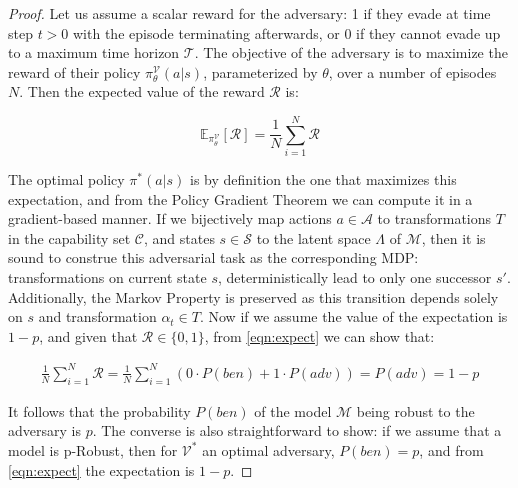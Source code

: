 \begin{proof}
Let us assume a scalar reward for the adversary: 1 if they evade at time step $t > 0$ with the episode terminating afterwards, or 0 if they cannot evade up to a maximum time horizon $\mathcal{T}$.
The objective of the adversary is to maximize the reward of their policy $\pi_\theta^\mathcal{V}(a|s)$, parameterized by $\theta$, over a number of episodes $N$.
Then the expected value of the reward $\mathcal{R}$ is:

\begin{equation}
    \mathbb{E}_{\pi_\theta^\mathcal{V}}[\mathcal{R}] = \frac{1}{N}\sum_{i=1}^{N}\mathcal{R}
\label{eqn:expect}
\end{equation}

The optimal policy $\pi^*(a|s)$ is by definition the one that maximizes this expectation, and from the Policy Gradient Theorem \cite{sutton1999policy} we can compute it in a gradient-based manner.
If we bijectively map actions $a \in \mathcal{A}$ to transformations $T$ in the capability set $\mathcal{C}$, and states $s \in \mathcal{S}$ to the latent space $\Lambda$ of $\mathcal{M}$, then it is sound to construe this adversarial task as the corresponding MDP: transformations on current state $s$, deterministically lead to only one successor $s'$.
Additionally, the Markov Property is preserved as this transition depends solely on $s$ and transformation $\alpha_t \in T$. 
Now if we assume the value of the expectation is $1-p$, and given that $\mathcal{R} \in \{0,1\}$, from \eqref{eqn:expect} we can show that:

\begin{equation}
\begin{aligned}
    \frac{1}{N}\sum_{i=1}^{N}\mathcal{R} = \frac{1}{N}\sum_{i=1}^{N}(0 \cdot P(ben) + 1 \cdot P(adv)) = P(adv) = 1 - p
\label{eqn:expect2}
\end{aligned}
\end{equation}

It follows that the probability $P(ben)$ of the model $\mathcal{M}$ being robust to the adversary is $p$.
The converse is also straightforward to show: if we assume that a model is p-Robust, then for $\mathcal{V^*}$ an optimal adversary, $P(ben) = p$, and from \eqref{eqn:expect} the expectation is $1-p$.
\end{proof}

